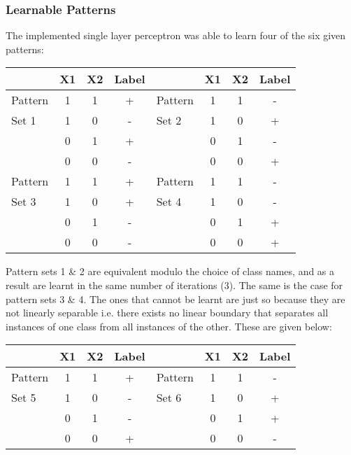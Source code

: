 \documentclass{article}
\begin{document}
\subsubsection*{Learnable Patterns}
The implemented single layer perceptron was able to learn four of the six given patterns:
\begin{center}
    \begin{tabular}{ l | c c c | l | c c c }
                & X1 & X2 & Label &         & X1 & X2 & Label \\
        \hline
        Pattern & 1  & 1  & +     & Pattern & 1  & 1  & -     \\
        Set 1   & 1  & 0  & -     & Set 2   & 1  & 0  & +     \\
                & 0  & 1  & +     &         & 0  & 1  & -     \\
                & 0  & 0  & -     &         & 0  & 0  & +     \\
        \hline
        Pattern & 1  & 1  & +     & Pattern & 1  & 1  & -     \\
        Set 3   & 1  & 0  & +     & Set 4   & 1  & 0  & -     \\
                & 0  & 1  & -     &         & 0  & 1  & +     \\
                & 0  & 0  & -     &         & 0  & 0  & +     \\
    \end{tabular}
\end{center}
Pattern sets 1 \& 2 are equivalent modulo the choice of class names, and as a result are learnt in the same number of iterations (3). The same is the case for pattern sets 3 \& 4. The ones that cannot be learnt are just so because they are not linearly separable i.e. there exists no linear boundary that separates all instances of one class from all instances of the other. These are given below:
\begin{center}
    \begin{tabular}{ l | c c c | l | c c c }
                & X1 & X2 & Label &         & X1 & X2 & Label \\
        \hline
        Pattern & 1  & 1  & +     & Pattern & 1  & 1  & -     \\
        Set 5   & 1  & 0  & -     & Set 6   & 1  & 0  & +     \\
                & 0  & 1  & -     &         & 0  & 1  & +     \\
                & 0  & 0  & +     &         & 0  & 0  & -     \\
    \end{tabular}
\end{center}
\end{document}
